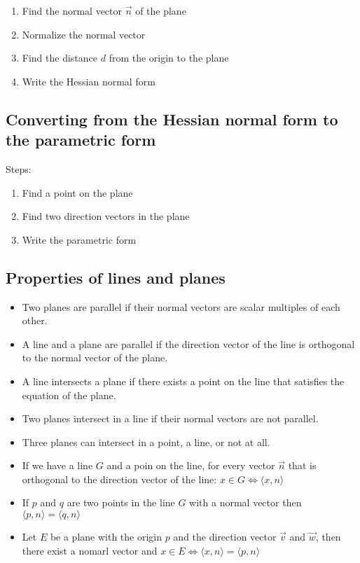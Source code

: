 \begin{enumerate}
	\item Find the normal vector \(\vec{n}\) of the plane
	\item Normalize the normal vector
	\item Find the distance \(d\) from the origin to the plane
	\item Write the Hessian normal form
\end{enumerate}

\subsection{Converting from the Hessian normal form to the parametric form}
Steps:
\begin{enumerate}
	\item Find a point on the plane
	\item Find two direction vectors in the plane
	\item Write the parametric form
\end{enumerate}

\subsection{Properties of lines and planes}
\begin{itemize}[label=\(-\)]
	\item Two planes are parallel if their normal vectors are scalar multiples of each other.
	\item A line and a plane are parallel if the direction vector of the line is orthogonal to the normal vector of the plane.
	\item A line intersects a plane if there exists a point on the line that satisfies the equation of the plane.
	\item Two planes intersect in a line if their normal vectors are not parallel.
	\item Three planes can intersect in a point, a line, or not at all.
	\item If we have a line \(G\) and a poin on the line, for every vector \(\vec{n}\) that is orthogonal to the
	      direction vector of the line: \(x \in G \iff \langle x, n \rangle\)
	\item If \(p\) and \(q\) are two points in the line \(G\) with a normal vector then \(\langle p, n\rangle = \langle q, n\rangle\)
	\item Let \(E\) be a plane with the origin \(p\) and the direction vector \(\vec{v}\) and \(\vec{w}\), then there exist a nomarl vector and
	      \(x \in E \iff \langle x, n\rangle = \langle p, n \rangle\)
\end{itemize}

